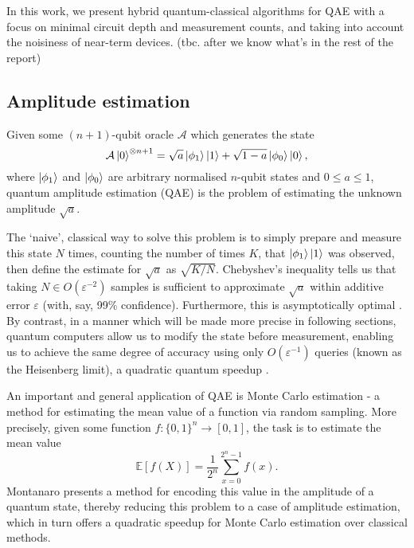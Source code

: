 In this work, we present hybrid quantum-classical algorithms for QAE with a focus on minimal circuit depth and measurement counts, and taking into account the noisiness of near-term devices. {\color{purple} (tbc. after we know what's in the rest of the report)}

\subsection{Amplitude estimation}

\begin{problem}
	Given some $(n+1)$-qubit oracle $\mathcal{A}$ which generates the state
	\[
	\mathcal{A} \ket{0}^{\otimes n+1} = \sqrt{a} \ket{\phi_1} \ket{1} + \sqrt{1-a} \ket{\phi_0} \ket{0},
	\]
	where $\ket{\phi_1}$ and $\ket{\phi_0}$ are arbitrary normalised $n$-qubit states and $0 \leq a \leq  1$, quantum amplitude estimation (QAE) is the problem of estimating the unknown amplitude $\sqrt{a}$.
\end{problem}

The `naive', classical way to solve this problem is to simply prepare and measure this state $N$ times, counting the number of times $K$, that $\ket{\phi_1}\ket{1}$ was observed, then define the estimate for $\sqrt{a}$ as $\sqrt{K/N}$. Chebyshev's inequality tells us that taking $N \in O(\varepsilon^{-2})$ samples is sufficient to approximate $\sqrt{a}$ within additive error $\varepsilon$ (with, say, 99\% confidence). Furthermore, this is asymptotically optimal \cite{dagum_2000_opt_alg_for_MC_est}. By contrast, in a manner which will be made more precise in following sections, quantum computers allow us to modify the state before measurement, enabling us to achieve the same degree of accuracy using only $O(\varepsilon^{-1})$ queries (known as the Heisenberg limit), a quadratic quantum speedup \cite{brassard_2002_q_amp_amp}.

An important and general application of QAE is Monte Carlo estimation \cite{heinrich_2002_q_sum_for_integration, montanaro_2015_q_MC_methods, suzuki_2020_amp_without_phase} - a method for estimating the mean value of a function via random sampling. More precisely, given some function $f : \{0,1\}^n \rightarrow [0,1]$, the task is to estimate the mean value
\[
\mathbb{E}[f(X)] = \frac{1}{2^n} \sum_{x=0}^{2^n-1} {f(x)}.
\]
Montanaro \cite{montanaro_2015_q_MC_methods} presents a method for encoding this value in the amplitude of a quantum state, thereby reducing this problem to a case of amplitude estimation, which in turn offers a quadratic speedup for Monte Carlo estimation over classical methods.

